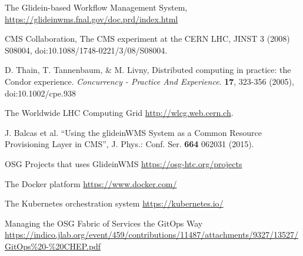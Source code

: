 \documentclass{webofc}
\begin{document}
\begin{thebibliography}{}
 The Glidein-based Workflow Management System, \url{https://glideinwms.fnal.gov/doc.prd/index.html}

 CMS Collaboration, The CMS experiment at the CERN LHC, 
JINST 3 (2008) S08004, doi:10.1088/1748-0221/3/08/S08004.

 D. Thain, T. Tannenbaum, \& M. Livny, Distributed computing in practice: the Condor experience. {\em Concurrency - Practice And Experience}. \textbf{17}, 323-356 (2005),  doi:10.1002/cpe.938


 The Worldwide LHC Computing Grid \url{http://wlcg.web.cern.ch}.

 J. Balcas et al. ``Using the glideinWMS System as a Common Resource Provisioning Layer in CMS'', J. Phys.: Conf. Ser. \textbf{664} 062031 (2015).

 OSG Projects that uses GlideinWMS \url{https://osg-htc.org/projects}

 The Docker platform \url{https://www.docker.com/}

 The Kubernetes orchestration system \url{https://kubernetes.io/}

 Managing the OSG Fabric
of Services the GitOps Way \url{https://indico.jlab.org/event/459/contributions/11487/attachments/9327/13527/GitOps%20-%20CHEP.pdf}

\end{thebibliography}
\end{document}
